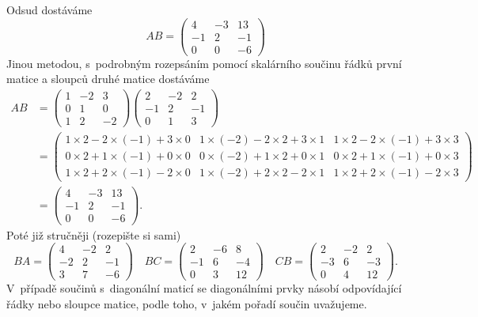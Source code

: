 Odsud dostáváme
\begin{equation*}
AB=  \begin{pmatrix}
  4 & -3 & 13 \\
  -1 & 2 & -1\\
  0 & 0 & -6
\end{pmatrix}
\end{equation*}
Jinou metodou, s podrobným rozepsáním pomocí skalárního součinu řádků první matice a sloupců druhé matice dostáváme
\begin{equation*}
  \begin{aligned}
  AB&=
   \begin{pmatrix}
  1 & -2 & 3\\
  0 & 1 & 0\\
  1 & 2 & -2
\end{pmatrix} \begin{pmatrix}
  2 & -2 & 2\\
  -1 & 2 & -1\\
  0 & 1 & 3
\end{pmatrix}
\\&=
\begin{pmatrix}
  1\times 2-2\times (-1)+3\times 0 & 1\times (-2)-2\times 2+3\times 1 & 1\times 2-2\times (-1)+3\times 3\\
  0\times 2 +1\times (-1) +0\times 0  &   0\times (-2) +1\times 2 +0\times 1  &   0\times 2 +1\times (-1) +0\times 3  \\
  1\times 2 +2\times (-1) -2\times 0 &  1\times (-2) +2\times 2 -2\times 1 &  1\times 2 +2\times (-1) -2\times 3
\end{pmatrix}
\\&=
\begin{pmatrix}
  4 & -3 & 13 \\
  -1 & 2 & -1\\
  0 & 0 & -6
\end{pmatrix}.
\end{aligned}
\end{equation*}
Poté již stručněji (rozepište si sami)
\begin{equation*}
   BA=
   \begin{pmatrix}
     4 & -2 & 2 \\
-2 & 2 & -1 \\
3 & 7 & -6
\end{pmatrix}\quad
BC=
\begin{pmatrix}
  2 & -6 & 8 \\
-1 & 6 & -4 \\
0 & 3 & 12
\end{pmatrix}
\quad
CB=
\begin{pmatrix}
  2 & -2 & 2 \\
-3 & 6 & -3 \\
0 & 4 & 12
\end{pmatrix}.
\end{equation*}
V případě součinů s diagonální maticí se diagonálními prvky násobí odpovídající řádky nebo sloupce matice, podle toho, v jakém pořadí součin uvažujeme.
\konec


